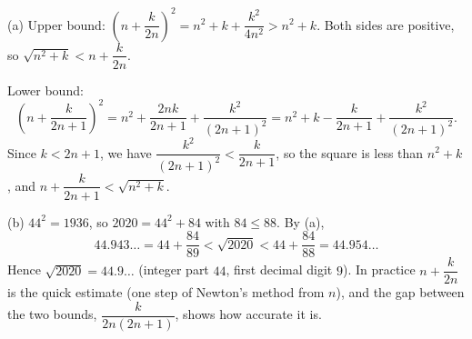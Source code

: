 (a) Upper bound: \(\left(n+\dfrac{k}{2n}\right)^2=n^2+k+\dfrac{k^2}{4n^2}>n^2+k\). Both sides are positive, so \(\sqrt{n^2+k}<n+\dfrac{k}{2n}\).

Lower bound:
\[
\left(n+\dfrac{k}{2n+1}\right)^2=n^2+\dfrac{2nk}{2n+1}+\dfrac{k^2}{(2n+1)^2}=n^2+k-\dfrac{k}{2n+1}+\dfrac{k^2}{(2n+1)^2}.
\]
Since \(k<2n+1\), we have \(\dfrac{k^2}{(2n+1)^2}<\dfrac{k}{2n+1}\), so the square is less than \(n^2+k\), and \(n+\dfrac{k}{2n+1}<\sqrt{n^2+k}\).

(b) \(44^2=1936\), so \(2020=44^2+84\) with \(84\le 88\). By (a),
\[
44.943\ldots=44+\dfrac{84}{89}<\sqrt{2020}<44+\dfrac{84}{88}=44.954\ldots
\]
Hence \(\sqrt{2020}=\boxed{44.9\ldots}\) (integer part \(44\), first decimal digit \(9\)). In practice \(n+\dfrac{k}{2n}\) is the quick estimate (one step of Newton's method from \(n\)), and the gap between the two bounds, \(\dfrac{k}{2n(2n+1)}\), shows how accurate it is.
